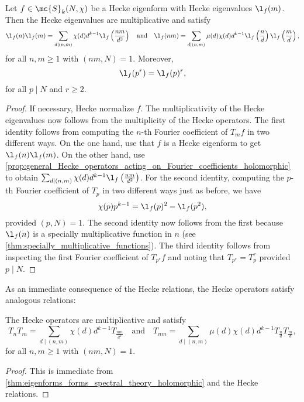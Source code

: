     \begin{proposition}
    Let $f \in \mc{S}_{k}(N,\chi)$ be a Hecke eigenform with Hecke eigenvalues $\l_{f}(m)$. Then the Hecke eigenvalues are multiplicative and satisfy
    \[
      \l_{f}(n)\l_{f}(m) = \sum_{d \mid (n,m)}\chi(d)d^{k-1}\l_{f}\left(\frac{nm}{d^{2}}\right) \quad \text{and} \quad \l_{f}(nm) = \sum_{d \mid (n,m)}\mu(d)\chi(d)d^{k-1}\l_{f}\left(\frac{n}{d}\right)\l_{f}\left(\frac{m}{d}\right),
    \]
    for all $n,m \ge 1$ with $(nm,N) = 1$. Moreover,
    \[
      \l_{f}(p^{r}) = \l_{f}(p)^{r},
    \]
    for all $p \mid N$ and $r \ge 2$.
    \end{proposition}
    \begin{proof}
      If necessary, Hecke normalize $f$. The multiplicativity of the Hecke eigenvalues now follows from the multiplicity of the Hecke operators. The first identity follows from computing the $n$-th Fourier coefficient of $T_{m}f$ in two different ways. On the one hand, use that $f$ is a Hecke eigenform to get $\l_{f}(n)\l_{f}(m)$. On the other hand, use \cref{prop:general_Hecke_operators_acting_on_Fourier_coefficients_holomorphic} to obtain $\sum_{d \mid (n,m)}\chi(d)d^{k-1}\l_{f}\left(\frac{nm}{d^{2}}\right)$. For the second identity, computing the $p$-th Fourier coefficient of $T_{p}$ in two different ways just as before, we have
      \[
        \chi(p)p^{k-1} = \l_{f}(p)^{2}-\l_{f}(p^{2}),
      \]
      provided $(p,N) = 1$. The second identity now follows from the first because $\l_{f}(n)$ is a specially multiplicative function in $n$ (see \cref{thm:specially_multiplicative_functions}). The third identity follows from inspecting the first Fourier coefficient of $T_{p^{r}}f$ and noting that $T_{p^{r}} = T_{p}^{r}$ provided $p \mid N$.
    \end{proof}

    As an immediate consequence of the Hecke relations, the Hecke operators satisfy analogous relations:

    \begin{corollary}\label{cor:Hecke_relations_operator_holomorphic}
      The Hecke operators are multiplicative and satisfy
      \[
        T_{n}T_{m} = \sum_{d \mid (n,m)}\chi(d)d^{k-1}T_{\frac{nm}{d^{2}}} \quad \text{and} \quad T_{nm} = \sum_{d \mid (n,m)}\mu(d)\chi(d)d^{k-1}T_{\frac{n}{d}}T_{\frac{m}{d}},
      \]
      for all $n,m \ge 1$ with $(nm,N) = 1$.
    \end{corollary}
    \begin{proof}
      This is immediate from \cref{thm:eigenforms_forms_spectral_theory_holomorphic} and the Hecke relations.
    \end{proof}

